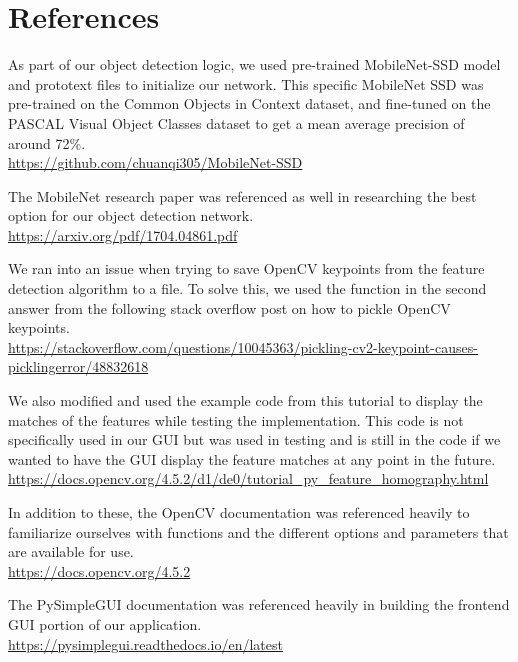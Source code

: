 \documentclass[12pt]{article}
\begin{document}
\section*{References}
	As part of our object detection logic, we used pre-trained MobileNet-SSD model and prototext files to initialize our network. This specific MobileNet SSD was pre-trained on the Common Objects in Context dataset, and fine-tuned on the PASCAL Visual Object Classes dataset to get a mean average precision of around 72\%. \\
	\url{https://github.com/chuanqi305/MobileNet-SSD}
	
	The MobileNet research paper was referenced as well in researching the best option for our object detection network. \\ \url{https://arxiv.org/pdf/1704.04861.pdf}
	
	We ran into an issue when trying to save OpenCV keypoints from the feature detection algorithm to a file. To solve this, we used the function in the second answer from the following stack overflow post on how to pickle OpenCV keypoints. \\ \url{https://stackoverflow.com/questions/10045363/pickling-cv2-keypoint-causes-picklingerror/48832618}
	
	
	We also modified and used the example code from this tutorial to display the matches of the features while testing the implementation. This code is not specifically used in our GUI but was used in testing and is still in the code if we wanted to have the GUI display the feature matches at any point in the future. \\
	\url{https://docs.opencv.org/4.5.2/d1/de0/tutorial_py_feature_homography.html}
	
	In addition to these, the OpenCV documentation was referenced heavily to familiarize ourselves with functions and the different options and parameters that are available for use. \\
	\url{https://docs.opencv.org/4.5.2}
	
	The PySimpleGUI documentation was referenced heavily in building the frontend GUI portion of our application. \\ \url{https://pysimplegui.readthedocs.io/en/latest}
\end{document}

